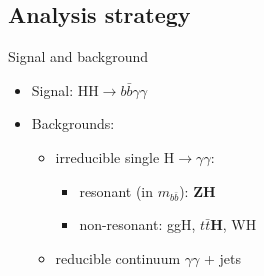 \subsection{Analysis strategy}

\begin{frame}{Signal and background}
   \begin{itemize}
       \item Signal: HH$\to b\bar{b}\gamma\gamma$
       \item Backgrounds: 
       \begin{itemize}
           \item irreducible single H$\to\gamma\gamma$:
           \begin{itemize}
               \item resonant (in $m_{b\bar{b}}$): \textbf{ZH} 
               \item non-resonant: ggH, \textbf{$t\bar{t}$H}, WH
           \end{itemize}
           \item reducible continuum $\gamma\gamma$ + jets
       \end{itemize}
   \end{itemize}
\end{frame}



